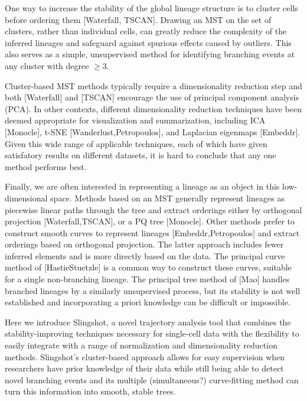 \documentclass[11pt]{article}\usepackage[]{graphicx}\usepackage[]{color}
\begin{document}
One way to increase the stability of the global lineage structure is to cluster cells before ordering them [Waterfall, TSCAN]. Drawing an MST on the set of clusters, rather than individual cells, can greatly reduce the complexity of the inferred lineages and safeguard against spurious effects caused by outliers. This also serves as a simple, unsupervised method for identifying branching events at any cluster with degree $\geq 3$.

Cluster-based MST methods typically require a dimensionality reduction step and both [Waterfall] and [TSCAN] encourage the use of principal component analysis (PCA). In other contexts, different dimensionality reduction techniques have been deemed appropriate for visualization and summarization, including ICA [Monocle], t-SNE [Wanderlust,Petropoulos], and Laplacian eigenmaps [Embeddr]. Given this wide range of applicable techniques, each of which have given satisfatory results on different datasets, it is hard to conclude that any one method performs best.

Finally, we are often interested in representing a lineage as an object in this low-dimensional space. Methods based on an MST generally represent lineages as piecewise linear paths through the tree and extract orderings either by orthogonal projection [Waterfall,TSCAN], or a PQ tree [Monocle]. Other methods prefer to construct smooth curves to represent lineages [Embeddr,Petropoulos] and extract orderings based on orthogonal projection. The latter approach includes fewer inferred elements and is more directly based on the data. The principal curve method of [HastieStuetzle] is a common way to construct these curves, suitable for a single non-branching lineage. The principal tree method of [Mao] handles branched lineages by a similarly unsupervised process, but its stability is not well established and incorporating a priori knowledge can be difficult or impossible.

Here we introduce Slingshot, a novel trajectory analysis tool that combines the stability-improving techniques necessary for single-cell data with the flexibility to easily integrate with a range of normalization and dimensionality reduction methods. Slingshot's cluster-based approach allows for easy supervision when researchers have prior knowledge of their data while still being able to detect novel branching events and its multiple (simultaneous?) curve-fitting method can turn this information into smooth, stable trees.

\end{document}
